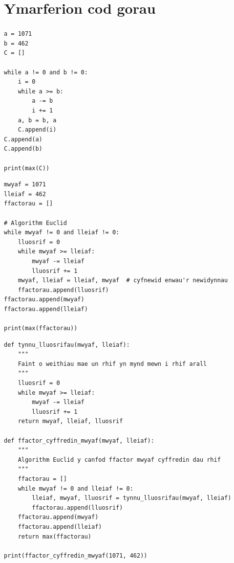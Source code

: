 \documentclass{beamer}
\begin{document}
\section[]{Ymarferion cod gorau}
\begin{frame}
\frametitle{\hfill}
\end{frame}

\begin{frame}[fragile]
\scriptsize{
\begin{verbatim}
a = 1071
b = 462
C = []

while a != 0 and b != 0:
    i = 0
    while a >= b:
        a -= b
        i += 1
    a, b = b, a
    C.append(i)
C.append(a)
C.append(b)

print(max(C))
\end{verbatim}
}
\end{frame}

\begin{frame}[fragile]
\scriptsize{
\begin{verbatim}
mwyaf = 1071
lleiaf = 462
ffactorau = []

# Algorithm Euclid
while mwyaf != 0 and lleiaf != 0:
    lluosrif = 0
    while mwyaf >= lleiaf:
        mwyaf -= lleiaf
        lluosrif += 1
    mwyaf, lleiaf = lleiaf, mwyaf  # cyfnewid enwau'r newidynnau
    ffactorau.append(lluosrif)
ffactorau.append(mwyaf)
ffactorau.append(lleiaf)

print(max(ffactorau))
\end{verbatim}
}
\end{frame}

\begin{frame}[fragile]
\scriptsize{
\begin{verbatim}
def tynnu_lluosrifau(mwyaf, lleiaf):
    """
    Faint o weithiau mae un rhif yn mynd mewn i rhif arall
    """
    lluosrif = 0
    while mwyaf >= lleiaf:
        mwyaf -= lleiaf
        lluosrif += 1
    return mwyaf, lleiaf, lluosrif

def ffactor_cyffredin_mwyaf(mwyaf, lleiaf):
    """
    Algorithm Euclid y canfod ffactor mwyaf cyffredin dau rhif
    """
    ffactorau = []
    while mwyaf != 0 and lleiaf != 0:
        lleiaf, mwyaf, lluosrif = tynnu_lluosrifau(mwyaf, lleiaf)
        ffactorau.append(lluosrif)
    ffactorau.append(mwyaf)
    ffactorau.append(lleiaf)
    return max(ffactorau)

print(ffactor_cyffredin_mwyaf(1071, 462))
\end{verbatim}
}
\end{frame}
\end{document}
